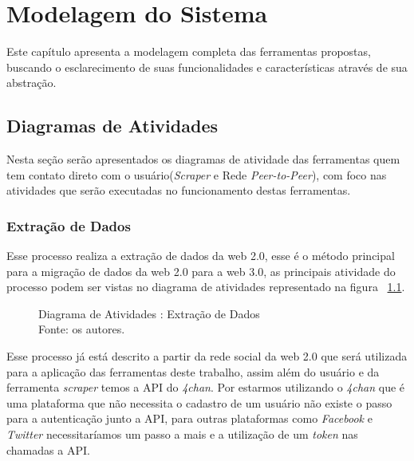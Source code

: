 
\chapter{Modelagem do Sistema}

Este capítulo apresenta a modelagem completa das ferramentas
propostas, buscando o esclarecimento de suas funcionalidades e características
através de sua abstração.

\section{Diagramas de Atividades}

Nesta seção serão apresentados os diagramas de atividade das ferramentas quem tem contato direto com o usuário(\textit{Scraper} e Rede \textit{Peer-to-Peer}), com foco nas atividades que serão executadas no funcionamento destas ferramentas.
\subsection{Extração de Dados\label{subsec:extracao_de_dados}}
Esse processo realiza a extração de dados da web 2.0, esse é o método principal para a migração de dados da web 2.0 para a web 3.0, as principais atividade do processo podem ser vistas no diagrama de atividades representado na figura ~\ref{fig:extracao_de_dados}.
\begin{figure}[H]
    \centering
    
    \caption[Diagrama de Atividades : Extração de Dados]{\label{fig:extracao_de_dados}
        Diagrama de Atividades : Extração de Dados\\
        Fonte: os autores.
    }
\end{figure}
Esse processo já está descrito a partir da rede social da web 2.0 que será utilizada para a aplicação das ferramentas deste trabalho, assim além
do usuário e da ferramenta \textit{scraper} temos a API do \textit{4chan}. Por estarmos utilizando o \textit{4chan} que é uma plataforma que não necessita o cadastro de um usuário não existe o passo para a autenticação junto a API, para outras plataformas como \textit{Facebook} e \textit{Twitter} necessitaríamos um passo a mais e a utilização  de um \textit{token} nas chamadas a API.

